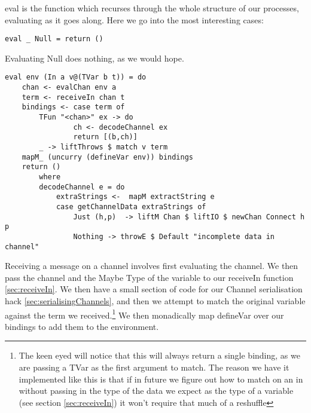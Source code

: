 eval is the function which recurses through the whole structure of our processes, evaluating as it goes along. Here we go into the most interesting cases:


\begin{verbatim}
eval _ Null = return ()
\end{verbatim}
Evaluating Null does nothing, as we would hope.

\begin{verbatim}
eval env (In a v@(TVar b t)) = do
    chan <- evalChan env a
    term <- receiveIn chan t
    bindings <- case term of
        TFun "<chan>" ex -> do
                ch <- decodeChannel ex
                return [(b,ch)]
        _ -> liftThrows $ match v term
    mapM_ (uncurry (defineVar env)) bindings
    return ()
        where
        decodeChannel e = do
            extraStrings <-  mapM extractString e
            case getChannelData extraStrings of
                Just (h,p)  -> liftM Chan $ liftIO $ newChan Connect h p
                Nothing -> throwE $ Default "incomplete data in channel"
\end{verbatim}

Receiving a message on a channel involves first evaluating the channel. We then pass the channel and the Maybe Type of the variable to our receiveIn function \ref{sec:receiveIn}. We then have a small section of code for our Channel serialisation hack \ref{sec:serialisingChannels}, and then we attempt to match the original variable against the term we received.\footnote{The keen eyed will notice that this will always return a single binding, as we are passing a TVar as the first
    argument to match. The reason we have it implemented like this is that if in future we figure out how to match on an in without passing in the type of the data we expect as the type of a variable (see section \ref{sec:receiveIn}) it won't require that much of a reshuffle}
We then monadically map defineVar over our bindings to add them to the environment.

